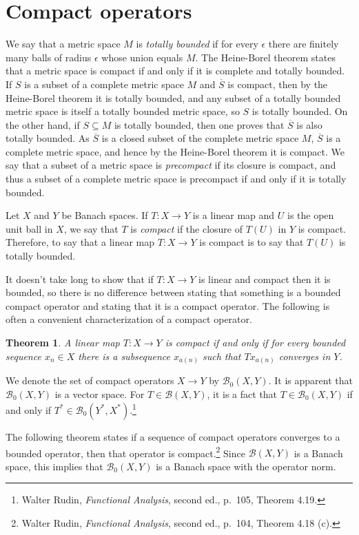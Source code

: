 \documentclass{article}
\newtheorem{theorem}{Theorem}
\begin{document}
\section{Compact operators}
We say that a metric space $M$ is {\em totally bounded} if for every $\epsilon$ there are finitely many balls of radius $\epsilon$ whose union equals $M$.
The Heine-Borel theorem states that a metric space is compact if and only if it is complete and totally bounded. If $S$ is a subset of a complete metric space $M$ and
$\overline{S}$ is compact, then by the Heine-Borel theorem it is totally bounded, and any subset of a totally bounded metric space is itself a totally bounded metric space,
so $S$ is totally bounded. On the other hand, if $S \subseteq M$ is totally bounded, then one proves that $\overline{S}$ is also totally bounded. As $\overline{S}$ is a closed
subset of the complete metric space $M$, $\overline{S}$ is a complete metric space, and hence by the Heine-Borel theorem it is compact. 
 We say that a subset of a metric space is {\em precompact} if its closure is compact, and thus
a subset of a complete metric
space is precompact if and only if it is totally bounded.

Let $X$ and $Y$ be Banach spaces. If $T:X \to Y$ is a linear map and $U$ is the open unit ball in $X$, we say that $T$ is {\em compact} if the closure
of $T(U)$ in $Y$ is compact.
Therefore, to say that a linear map $T:X \to Y$ is compact is to say that $T(U)$ is totally bounded.

It doesn't take long to show that if $T:X \to Y$ is linear and compact then it is bounded, so there is no difference between stating that something is a bounded
compact operator and stating that it is a compact operator.
The following is often a convenient characterization of a compact operator.

\begin{theorem}
A linear map $T:X \to Y$ is compact if and only if for every bounded sequence $x_n \in X$ there is a subsequence
$x_{a(n)}$ such that $Tx_{a(n)}$ converges in $Y$.
\end{theorem}

We denote the set of compact operators $X \to Y$ by $\mathscr{B}_0(X,Y)$. It is apparent that $\mathscr{B}_0(X,Y)$ is a vector space.
For $T \in \mathscr{B}(X,Y)$, it is a fact that $T \in \mathscr{B}_0(X,Y)$  if and only if $T^* \in \mathscr{B}_0(Y^*,X^*)$.\footnote{Walter
Rudin, {\em Functional Analysis}, second ed., p.~105, Theorem 4.19.} 

The following theorem states if a sequence of compact operators converges to a bounded operator, then that operator is compact.\footnote{Walter
Rudin, {\em Functional Analysis}, second ed., p.~104, Theorem 4.18 (c).} Since $\mathscr{B}(X,Y)$ is a Banach space, this implies that $\mathscr{B}_0(X,Y)$ is a Banach space with the operator
norm.
\end{document}
